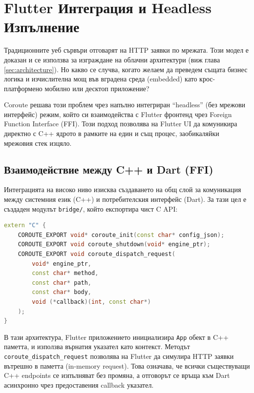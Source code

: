 \section{Flutter Интеграция и Headless Изпълнение}
\label{sec:flutter-integration}

Традиционните уеб сървъри отговарят на HTTP заявки по мрежата. Този модел е доказан и се използва за изграждане на облачни архитектури (виж глава \ref{sec:architecture}). Но какво се случва, когато желаем да преведем същата бизнес логика и изчислителна мощ във вградена среда (embedded) като крос-платформено мобилно или десктоп приложение?

Coroute решава този проблем чрез напълно интегриран ``headless'' (без мрежови интерфейс) режим, който си взаимодейства с Flutter фронтенд чрез Foreign Function Interface (FFI). Този подход позволява на Flutter UI да комуникира директно с C++ ядрото в рамките на един и същ процес, заобикаляйки мрежовия стек изцяло.

\subsection{Взаимодействие между C++ и Dart (FFI)}
Интеграцията на високо ниво изисква създаването на общ слой за комуникация между системния език (C++) и потребителския интерфейс (Dart). За тази цел е създаден модулът \texttt{bridge/}, който експортира чист C API:

\begin{lstlisting}[language=C++, basicstyle=\small\ttfamily, caption={Експортиране на C функции от Coroute}]
extern "C" {
    COROUTE_EXPORT void* coroute_init(const char* config_json);
    COROUTE_EXPORT void coroute_shutdown(void* engine_ptr);
    COROUTE_EXPORT void coroute_dispatch_request(
        void* engine_ptr, 
        const char* method, 
        const char* path, 
        const char* body, 
        void (*callback)(int, const char*)
    );
}
\end{lstlisting}

В тази архитектура, Flutter приложението инициализира \texttt{App} обект в C++ паметта, и използва върнатия указател като контекст. Методът \texttt{coroute\_dispatch\_request} позволява на Flutter да симулира HTTP заявки вътрешно в паметта (in-memory request). Това означава, че всички съществуващи C++ endpoints се изпълняват без промяна, а отговорът се връща към Dart асинхронно чрез предоставения callback указател.

